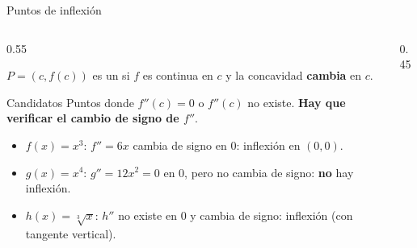 \documentclass[10pt,aspectratio=169]{beamer}
\begin{document}
\begin{frame}{Puntos de inflexión}
  \begin{columns}
    \begin{column}{0.55\textwidth}
      \begin{definicion}
        $P=(c,f(c))$ es un  si $f$ es continua en $c$ y la concavidad \textbf{cambia} en $c$.
      \end{definicion}
      \begin{block}{Candidatos}
        Puntos donde $f''(c)=0$ o $f''(c)$ no existe. \textbf{Hay que verificar el cambio de signo de $f''$}.
      \end{block}
      \begin{ejemplo}[1]
        \begin{itemize}
          \item $f(x)=x^3$: $f''=6x$ cambia de signo en $0$: inflexión en $(0,0)$.
          \item $g(x)=x^4$: $g''=12x^2=0$ en $0$, pero no cambia de signo: \textbf{no} hay inflexión.
          \item $h(x)=\sqrt[3]x$: $h''$ no existe en $0$ y cambia de signo: inflexión (con tangente vertical).
        \end{itemize}
      \end{ejemplo}
    \end{column}
    \begin{column}{0.45\textwidth}
      \centering
    \end{column}
  \end{columns}
\end{frame}
\end{document}
